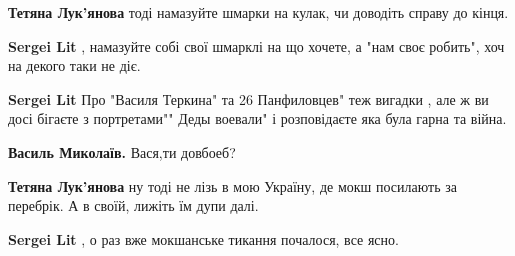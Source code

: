 \begin{itemize}
\begin{itemize}
\textbf{Тетяна Лук'янова} тоді намазуйте шмарки на кулак, чи доводіть справу до кінця.

 
\textbf{Sergei Lit} , намазуйте собі свої шмарклі на що хочете, а "нам своє робить", хоч на декого таки не діє.

 
\textbf{Sergei Lit} Про "Василя Теркина" та 26 Панфиловцев" теж вигадки , але ж ви досі бігаєте з портретами"" Деды воевали" і розповідаєте яка була гарна та війна.

 
\textbf{Василь Миколаїв.} Вася,ти довбоеб?

 
\textbf{Тетяна Лук'янова} ну тоді не лізь в мою Україну, де мокш посилають за перебрік. А в своїй, лижіть їм дупи далі.

 
\textbf{Sergei Lit} , о раз вже мокшанське тикання почалося, все ясно.

 

\end{itemize}
\end{itemize}
